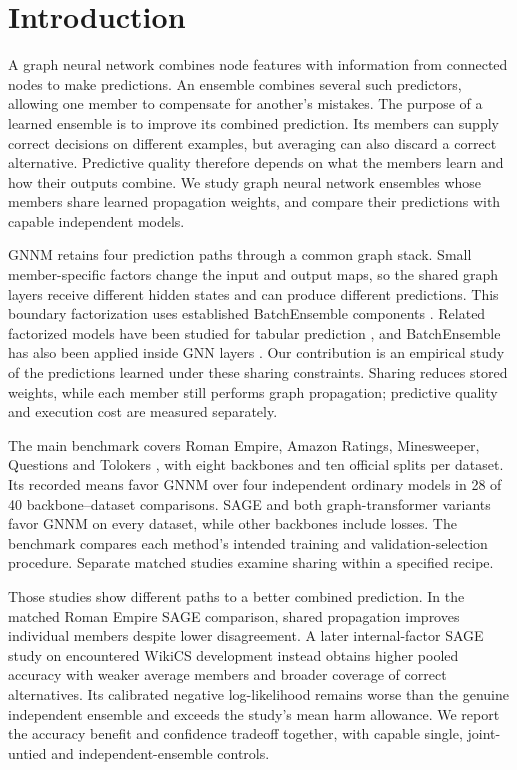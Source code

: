 \section{Introduction}
A graph neural network combines node features with information from connected nodes to make predictions. An ensemble combines several such predictors, allowing one member to compensate for another's mistakes. The purpose of a learned ensemble is to improve its combined prediction. Its members can supply correct decisions on different examples, but averaging can also discard a correct alternative. Predictive quality therefore depends on what the members learn and how their outputs combine. We study graph neural network ensembles whose members share learned propagation weights, and compare their predictions with capable independent models.

GNNM retains four prediction paths through a common graph stack. Small member-specific factors change the input and output maps, so the shared graph layers receive different hidden states and can produce different predictions. This boundary factorization uses established BatchEnsemble components \citep{wen2020batchensemble}. Related factorized models have been studied for tabular prediction \citep{gorishniy2025tabm}, and BatchEnsemble has also been applied inside GNN layers \citep{kim2023efficient}. Our contribution is an empirical study of the predictions learned under these sharing constraints. Sharing reduces stored weights, while each member still performs graph propagation; predictive quality and execution cost are measured separately.

The main benchmark covers Roman Empire, Amazon Ratings, Minesweeper, Questions and Tolokers \citep{platonov2023critical}, with eight backbones and ten official splits per dataset. Its recorded means favor GNNM over four independent ordinary models in 28 of 40 backbone--dataset comparisons. SAGE and both graph-transformer variants favor GNNM on every dataset, while other backbones include losses. The benchmark compares each method's intended training and validation-selection procedure. Separate matched studies examine sharing within a specified recipe.

Those studies show different paths to a better combined prediction. In the matched Roman Empire SAGE comparison, shared propagation improves individual members despite lower disagreement. A later internal-factor SAGE study on encountered WikiCS development instead obtains higher pooled accuracy with weaker average members and broader coverage of correct alternatives. Its calibrated negative log-likelihood remains worse than the genuine independent ensemble and exceeds the study's mean harm allowance. We report the accuracy benefit and confidence tradeoff together, with capable single, joint-untied and independent-ensemble controls.

